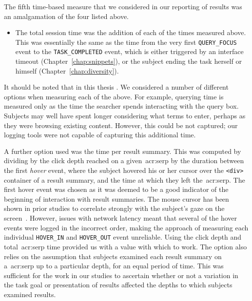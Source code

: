 The fifth time-based measure that we considered in our reporting of results was an amalgamation of the four listed above.

\begin{itemize}
    \item{ The total session time was the addition of each of the times measured above. This was essentially the same as the time from the very first \texttt{QUERY\_FOCUS} event to the \texttt{TASK\_COMPLETED} event, which is either triggered by an interface timeout (Chapter~\ref{chap:snippets}), or the subject ending the task herself or himself (Chapter~\ref{chap:diversity}).}
    
\end{itemize}

It should be noted that in this thesis . We considered a number of different options when measuring each of the above. For example, querying time is measured only as the time the searcher spends interacting with the query box. Subjects may well have spent longer considering what terms to enter, perhaps as they were browsing existing content. However, this could be not captured; our logging tools were not capable of capturing this additional time.

A further option used was the time per result summary. This was computed by dividing by the click depth reached on a given~\gls{acr:serp} by the duration between the first \emph{hover} event, where the subject hovered his or her cursor over the \texttt{<div>} container of a result summary, and the time at which they left the~\gls{acr:serp}. The first hover event was chosen as it was deemed to be a good indicator of the beginning of interaction with result summaries. The mouse cursor has been shown in prior studies to correlate strongly with the subject's gaze on the screen~\citep{chen2001mouse_cursor, smucker2014judging_relevance_movements}. However, issues with network latency meant that several of the hover events were logged in the incorrect order, making the approach of measuring each individual \texttt{HOVER\_IN} and \texttt{HOVER\_OUT} event unreliable. Using the click depth and total~\gls{acr:serp} time provided us with a value with which to work. The option also relies on the assumption that subjects examined each result summary on a~\gls{acr:serp} up to a particular depth, for an equal period of time. This was sufficient for the work in our studies to ascertain whether or not a variation in the task goal or presentation of results affected the depths to which subjects examined results.

